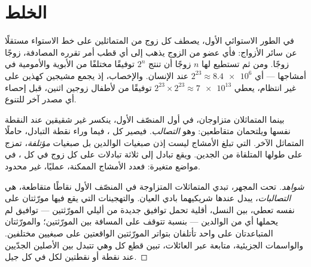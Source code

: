 \section{الخلط}

\begin{proposition}\label{prop:g12:meiosis-genetic-shuffling:assortment}
في الطور الاستوائي الأول، يصطف كل زوج من المتماثلين على خط الاستواء
مستقلًا عن سائر الأزواج: فأي عضو من الزوج يذهب إلى أي قطب أمر تقرره
المصادفة، زوجًا زوجًا. ومن ثم تستطيع  لها $n$ زوجًا أن تنتج $2^n$
توفيقًا مختلفًا من  الأبوية والأمومية في أمشاجها --- أي
$2^{23} \approx \num{8.4e6}$ عند الإنسان. والإخصاب، إذ يجمع مشيجين
كهذين على غير انتظام، يعطي $2^{23}
\times 2^{23} \approx \num{7e13}$ توفيقًا من  لأطفال زوجين
اثنين، قبل إحصاء أي مصدر آخر للتنوع.
\end{proposition}
\admitted

\begin{proposition}[التصالب]\label{prop:g12:meiosis-genetic-shuffling:crossingover}
بينما المتماثلان متزاوجان، في أول المنصّف الأول، ينكسر  غير
شقيقين عند النقطة نفسها ويلتحمان متقاطعين: وهو \emph{التصالب}.
فيصير كل ، فيما وراء نقطة التبادل، حاملًا  المتماثل الآخر.
 التي تبلغ الأمشاج ليست إذن صبغيات الوالدين بل صبغيات
\emph{مؤتلفة}، تمزج على طولها  المتلقاة من الجدين. ويقع تبادل
إلى ثلاثة تبادلات على كل زوج في كل ، في مواضع متغيرة: فعدد
الأمشاج الممكنة، عمليًا، غير محدود.
\end{proposition}
\begin{proof}[شواهد]
تحت المجهر، تبدي المتماثلات المتزاوجة في المنصّف الأول نقاطًا متقاطعة،
هي \emph{التصالبات}، يبدل عندها  شريكيهما بادي العيان.
والتهجينات التي يقع فيها مورّثتان على  نفسه تعطي، بين النسل،
أقلية تحمل توافيق جديدة من أليلي المورّثتين --- توافيق لم يحملها أي من
الوالدين --- بنسبة تتوقف على المسافة بين المورّثتين؛ والمورّثتان
المتباعدتان على  واحد تأتلفان بتواتر المورّثتين الواقعتين على
صبغيين مختلفين. والواسمات الجزيئية، متابعة عبر العائلات، تبين قطع كل
 وهي تتبدل بين الأصلين الجدّيين عند نقطة أو نقطتين لكل  في كل
جيل.
\end{proof}

